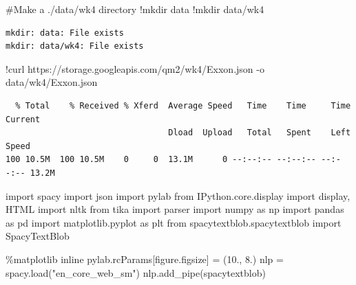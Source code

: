 \documentclass[
  letterpaper,
  DIV=11,
  numbers=noendperiod]{scrreprt}
\newenvironment{Shaded}{\begin{snugshade}}{\end{snugshade}}
\newcommand{\CommentTok}[1]{\textcolor[rgb]{0.37,0.37,0.37}{#1}}
\newcommand{\FloatTok}[1]{\textcolor[rgb]{0.68,0.00,0.00}{#1}}
\newcommand{\ImportTok}[1]{\textcolor[rgb]{0.00,0.46,0.62}{#1}}
\newcommand{\NormalTok}[1]{\textcolor[rgb]{0.00,0.23,0.31}{#1}}
\newcommand{\OperatorTok}[1]{\textcolor[rgb]{0.37,0.37,0.37}{#1}}
\newcommand{\StringTok}[1]{\textcolor[rgb]{0.13,0.47,0.30}{#1}}
\begin{document}
\begin{Shaded}
\begin{Highlighting}[]
\CommentTok{\#Make a ./data/wk4 directory}
\OperatorTok{!}\NormalTok{mkdir data}
\OperatorTok{!}\NormalTok{mkdir data}\OperatorTok{/}\NormalTok{wk4}
\end{Highlighting}
\end{Shaded}

\begin{verbatim}
mkdir: data: File exists
mkdir: data/wk4: File exists
\end{verbatim}

\begin{Shaded}
\begin{Highlighting}[]
\OperatorTok{!}\NormalTok{curl https:}\OperatorTok{//}\NormalTok{storage.googleapis.com}\OperatorTok{/}\NormalTok{qm2}\OperatorTok{/}\NormalTok{wk4}\OperatorTok{/}\NormalTok{Exxon.json }\OperatorTok{{-}}\NormalTok{o data}\OperatorTok{/}\NormalTok{wk4}\OperatorTok{/}\NormalTok{Exxon.json}
\end{Highlighting}
\end{Shaded}

\begin{verbatim}
  % Total    % Received % Xferd  Average Speed   Time    Time     Time  Current
                                 Dload  Upload   Total   Spent    Left  Speed
100 10.5M  100 10.5M    0     0  13.1M      0 --:--:-- --:--:-- --:--:-- 13.2M
\end{verbatim}

\begin{Shaded}
\begin{Highlighting}[]
\ImportTok{import}\NormalTok{ spacy}
\ImportTok{import}\NormalTok{ json}
\ImportTok{import}\NormalTok{ pylab}
\ImportTok{from}\NormalTok{ IPython.core.display }\ImportTok{import}\NormalTok{ display, HTML}
\ImportTok{import}\NormalTok{ nltk}
\ImportTok{from}\NormalTok{ tika }\ImportTok{import}\NormalTok{ parser}
\ImportTok{import}\NormalTok{ numpy }\ImportTok{as}\NormalTok{ np}
\ImportTok{import}\NormalTok{ pandas }\ImportTok{as}\NormalTok{ pd}
\ImportTok{import}\NormalTok{ matplotlib.pyplot }\ImportTok{as}\NormalTok{ plt}
\ImportTok{from}\NormalTok{ spacytextblob.spacytextblob }\ImportTok{import}\NormalTok{ SpacyTextBlob}

\OperatorTok{\%}\NormalTok{matplotlib inline}
\NormalTok{pylab.rcParams[}\StringTok{\textquotesingle{}figure.figsize\textquotesingle{}}\NormalTok{] }\OperatorTok{=}\NormalTok{ (}\FloatTok{10.}\NormalTok{, }\FloatTok{8.}\NormalTok{)}
\NormalTok{nlp }\OperatorTok{=}\NormalTok{ spacy.load(}\StringTok{"en\_core\_web\_sm"}\NormalTok{)}
\NormalTok{nlp.add\_pipe(}\StringTok{\textquotesingle{}spacytextblob\textquotesingle{}}\NormalTok{)}
\end{Highlighting}
\end{Shaded}
\end{document}
